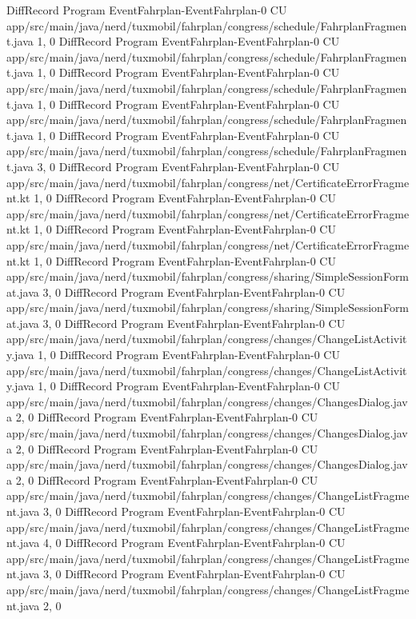 DiffRecord Program EventFahrplan-EventFahrplan-0 CU app/src/main/java/nerd/tuxmobil/fahrplan/congress/schedule/FahrplanFragment.java  {1, 0}
DiffRecord Program EventFahrplan-EventFahrplan-0 CU app/src/main/java/nerd/tuxmobil/fahrplan/congress/schedule/FahrplanFragment.java  {1, 0}
DiffRecord Program EventFahrplan-EventFahrplan-0 CU app/src/main/java/nerd/tuxmobil/fahrplan/congress/schedule/FahrplanFragment.java  {1, 0}
DiffRecord Program EventFahrplan-EventFahrplan-0 CU app/src/main/java/nerd/tuxmobil/fahrplan/congress/schedule/FahrplanFragment.java  {1, 0}
DiffRecord Program EventFahrplan-EventFahrplan-0 CU app/src/main/java/nerd/tuxmobil/fahrplan/congress/schedule/FahrplanFragment.java  {3, 0}
DiffRecord Program EventFahrplan-EventFahrplan-0 CU app/src/main/java/nerd/tuxmobil/fahrplan/congress/net/CertificateErrorFragment.kt  {1, 0}
DiffRecord Program EventFahrplan-EventFahrplan-0 CU app/src/main/java/nerd/tuxmobil/fahrplan/congress/net/CertificateErrorFragment.kt  {1, 0}
DiffRecord Program EventFahrplan-EventFahrplan-0 CU app/src/main/java/nerd/tuxmobil/fahrplan/congress/net/CertificateErrorFragment.kt  {1, 0}
DiffRecord Program EventFahrplan-EventFahrplan-0 CU app/src/main/java/nerd/tuxmobil/fahrplan/congress/sharing/SimpleSessionFormat.java  {3, 0}
DiffRecord Program EventFahrplan-EventFahrplan-0 CU app/src/main/java/nerd/tuxmobil/fahrplan/congress/sharing/SimpleSessionFormat.java  {3, 0}
DiffRecord Program EventFahrplan-EventFahrplan-0 CU app/src/main/java/nerd/tuxmobil/fahrplan/congress/changes/ChangeListActivity.java  {1, 0}
DiffRecord Program EventFahrplan-EventFahrplan-0 CU app/src/main/java/nerd/tuxmobil/fahrplan/congress/changes/ChangeListActivity.java  {1, 0}
DiffRecord Program EventFahrplan-EventFahrplan-0 CU app/src/main/java/nerd/tuxmobil/fahrplan/congress/changes/ChangesDialog.java  {2, 0}
DiffRecord Program EventFahrplan-EventFahrplan-0 CU app/src/main/java/nerd/tuxmobil/fahrplan/congress/changes/ChangesDialog.java  {2, 0}
DiffRecord Program EventFahrplan-EventFahrplan-0 CU app/src/main/java/nerd/tuxmobil/fahrplan/congress/changes/ChangesDialog.java  {2, 0}
DiffRecord Program EventFahrplan-EventFahrplan-0 CU app/src/main/java/nerd/tuxmobil/fahrplan/congress/changes/ChangeListFragment.java  {3, 0}
DiffRecord Program EventFahrplan-EventFahrplan-0 CU app/src/main/java/nerd/tuxmobil/fahrplan/congress/changes/ChangeListFragment.java  {4, 0}
DiffRecord Program EventFahrplan-EventFahrplan-0 CU app/src/main/java/nerd/tuxmobil/fahrplan/congress/changes/ChangeListFragment.java  {3, 0}
DiffRecord Program EventFahrplan-EventFahrplan-0 CU app/src/main/java/nerd/tuxmobil/fahrplan/congress/changes/ChangeListFragment.java  {2, 0}
